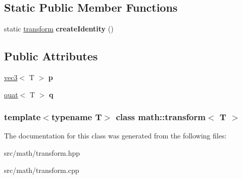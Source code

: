 \subsection*{Static Public Member Functions}
\begin{DoxyCompactItemize}
\item 
\hypertarget{classmath_1_1transform_ae251297ec816dd725affaff5ae2c1ab8}{
static \hyperlink{classmath_1_1transform}{transform} {\bfseries createIdentity} ()}
\label{classmath_1_1transform_ae251297ec816dd725affaff5ae2c1ab8}

\end{DoxyCompactItemize}
\subsection*{Public Attributes}
\begin{DoxyCompactItemize}
\item 
\hypertarget{classmath_1_1transform_ae2c65f8049388220d23b3cc55e87151c}{
\hyperlink{classmath_1_1vec3}{vec3}$<$ T $>$ {\bfseries p}}
\label{classmath_1_1transform_ae2c65f8049388220d23b3cc55e87151c}

\item 
\hypertarget{classmath_1_1transform_a942996749f0d6f49ef2c594cb296fd16}{
\hyperlink{classmath_1_1quat}{quat}$<$ T $>$ {\bfseries q}}
\label{classmath_1_1transform_a942996749f0d6f49ef2c594cb296fd16}

\end{DoxyCompactItemize}
\subsubsection*{template$<$typename T$>$ class math::transform$<$ T $>$}



The documentation for this class was generated from the following files:\begin{DoxyCompactItemize}
\item 
src/math/transform.hpp\item 
src/math/transform.cpp\end{DoxyCompactItemize}
